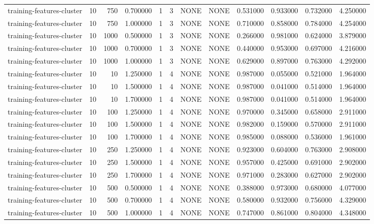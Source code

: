 \begin{tabular}{lrrrllllrrrr}
training-features-cluster & 10 & 750 & 0.700000 & 1 & 3 & NONE & NONE & 0.531000 & 0.933000 & 0.732000 & 4.250000 \\
training-features-cluster & 10 & 750 & 1.000000 & 1 & 3 & NONE & NONE & 0.710000 & 0.858000 & 0.784000 & 4.254000 \\
training-features-cluster & 10 & 1000 & 0.500000 & 1 & 3 & NONE & NONE & 0.266000 & 0.981000 & 0.624000 & 3.879000 \\
training-features-cluster & 10 & 1000 & 0.700000 & 1 & 3 & NONE & NONE & 0.440000 & 0.953000 & 0.697000 & 4.216000 \\
training-features-cluster & 10 & 1000 & 1.000000 & 1 & 3 & NONE & NONE & 0.629000 & 0.897000 & 0.763000 & 4.292000 \\
training-features-cluster & 10 & 10 & 1.250000 & 1 & 4 & NONE & NONE & 0.987000 & 0.055000 & 0.521000 & 1.964000 \\
training-features-cluster & 10 & 10 & 1.500000 & 1 & 4 & NONE & NONE & 0.987000 & 0.041000 & 0.514000 & 1.964000 \\
training-features-cluster & 10 & 10 & 1.700000 & 1 & 4 & NONE & NONE & 0.987000 & 0.041000 & 0.514000 & 1.964000 \\
training-features-cluster & 10 & 100 & 1.250000 & 1 & 4 & NONE & NONE & 0.970000 & 0.345000 & 0.658000 & 2.911000 \\
training-features-cluster & 10 & 100 & 1.500000 & 1 & 4 & NONE & NONE & 0.982000 & 0.159000 & 0.570000 & 2.911000 \\
training-features-cluster & 10 & 100 & 1.700000 & 1 & 4 & NONE & NONE & 0.985000 & 0.088000 & 0.536000 & 1.961000 \\
training-features-cluster & 10 & 250 & 1.250000 & 1 & 4 & NONE & NONE & 0.923000 & 0.604000 & 0.763000 & 2.908000 \\
training-features-cluster & 10 & 250 & 1.500000 & 1 & 4 & NONE & NONE & 0.957000 & 0.425000 & 0.691000 & 2.902000 \\
training-features-cluster & 10 & 250 & 1.700000 & 1 & 4 & NONE & NONE & 0.971000 & 0.283000 & 0.627000 & 2.902000 \\
training-features-cluster & 10 & 500 & 0.500000 & 1 & 4 & NONE & NONE & 0.388000 & 0.973000 & 0.680000 & 4.077000 \\
training-features-cluster & 10 & 500 & 0.700000 & 1 & 4 & NONE & NONE & 0.580000 & 0.932000 & 0.756000 & 4.329000 \\
training-features-cluster & 10 & 500 & 1.000000 & 1 & 4 & NONE & NONE & 0.747000 & 0.861000 & 0.804000 & 4.348000 \\

\end{tabular}
